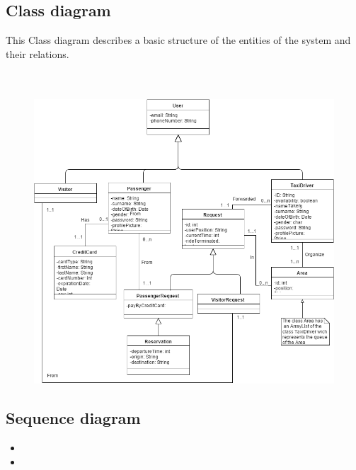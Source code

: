 \documentclass[18pt,oneside,a4paper, titlepage]{article}
\begin{document}
	\subsection{Class diagram}
	This Class diagram describes a basic structure of the entities of the system and their relations.
	\\ \\ \\ 
	\begin{figure}[h]
		\includegraphics[scale=0.55]{classDiagram.png}
	\end{figure}
\newpage
	\subsection{Sequence diagram}
	\begin{itemize}
		\item
		\item 
	\end{itemize}
\newpage
\end{document}
